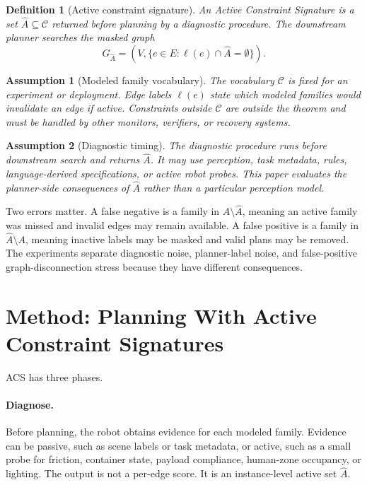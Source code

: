 \documentclass{article}
\newtheorem{definition}{Definition}
\newtheorem{assumption}{Assumption}
\newcommand{\ACS}{\textsc{ACS}}
\newcommand{\Cset}{\mathcal{C}}
\newcommand{\Ahat}{\hat{A}}
\newcommand{\Gmask}{G_{\Ahat}}
\begin{document}
\begin{definition}[Active constraint signature]
An Active Constraint Signature is a set $\Ahat \subseteq \Cset$ returned before planning by a diagnostic procedure. The downstream planner searches the masked graph
\[
    \Gmask = (V,\{e\in E: \ell(e)\cap \Ahat=\emptyset\}).
\]
\end{definition}

\begin{assumption}[Modeled family vocabulary]
The vocabulary $\Cset$ is fixed for an experiment or deployment. Edge labels $\ell(e)$ state which modeled families would invalidate an edge if active. Constraints outside $\Cset$ are outside the theorem and must be handled by other monitors, verifiers, or recovery systems.
\end{assumption}

\begin{assumption}[Diagnostic timing]
The diagnostic procedure runs before downstream search and returns $\Ahat$. It may use perception, task metadata, rules, language-derived specifications, or active robot probes. This paper evaluates the planner-side consequences of $\Ahat$ rather than a particular perception model.
\end{assumption}

Two errors matter. A false negative is a family in $A\setminus \Ahat$, meaning an active family was missed and invalid edges may remain available. A false positive is a family in $\Ahat\setminus A$, meaning inactive labels may be masked and valid plans may be removed. The experiments separate diagnostic noise, planner-label noise, and false-positive graph-disconnection stress because they have different consequences.

\section{Method: Planning With Active Constraint Signatures}

\ACS{} has three phases.

\paragraph{Diagnose.}
Before planning, the robot obtains evidence for each modeled family. Evidence can be passive, such as scene labels or task metadata, or active, such as a small probe for friction, container state, payload compliance, human-zone occupancy, or lighting. The output is not a per-edge score. It is an instance-level active set $\Ahat$.
\end{document}

